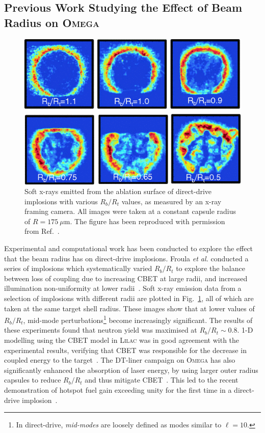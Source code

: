 \subsection{Previous Work Studying the Effect of Beam Radius on \textsc{Omega}}%
\label{sec:Res1_OMEGA_stat_modelling_RbRt}

\begin{figure}[t!]
    \includegraphics[width=0.5\linewidth]{Results1/Images/RbRt_froula.png}
    \centering
    \caption{Soft x-rays emitted from the ablation surface of direct-drive implosions with various $R_b/R_t$ values, as measured by an x-ray framing camera.
    All images were taken at a constant capsule radius of $R=175\ \mu\text{m}$.
    The figure has been reproduced with permission from Ref.~\cite{froula_increasing_2012}.}%
    \label{fig:RbRt_froula}
\end{figure}

Experimental and computational work has been conducted to explore the effect that the beam radius has on direct-drive implosions.
Froula \textit{et al.} conducted a series of implosions which systematically varied $R_b/R_t$ to explore the balance between loss of coupling due to increasing \ac{CBET} at large radii, and increased illumination non-uniformity at lower radii~\cite{froula_increasing_2012}.
Soft x-ray emission data from a selection of implosions with different radii are plotted in Fig.~\ref{fig:RbRt_froula}, all of which are taken at the same target shell radius.
These images show that at lower values of $R_b/R_t$, mid-mode perturbations\footnote{In direct-drive, \textit{mid-modes} are loosely defined as modes similar to $\ell=10$.} become increasingly significant.
The results of these experiments found that neutron yield was maximised at $R_b/R_t\sim 0.8$.
1-D modelling using the \ac{CBET} model in \textsc{Lilac} was in good agreement with the experimental results, verifying that \ac{CBET} was responsible for the decrease in coupled energy to the target~\cite{igumenshchev_crossedbeam_2012}.
The DT-liner campaign on \textsc{Omega} has also significantly enhanced the absorption of laser energy, by using larger outer radius capsules to reduce $R_b/R_t$ and thus mitigate \ac{CBET}~\cite{williams_high_2021}.
This led to the recent demonstration of hotspot fuel gain exceeding unity for the first time in a direct-drive implosion~\cite{williams_demonstration_2024}.

